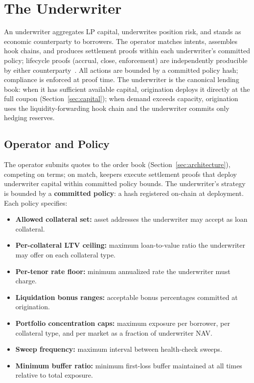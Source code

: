 \section{The Underwriter}
\label{sec:lp}

An underwriter aggregates LP capital, underwrites position risk, and stands as economic counterparty to borrowers. The operator matches intents, assembles hook chains, and produces settlement proofs within each underwriter's committed policy; lifecycle proofs (accrual, close, enforcement) are independently producible by either counterparty~\cite{daloc-decent2026}. All actions are bounded by a committed policy hash; compliance is enforced at proof time. The underwriter is the canonical lending book: when it has sufficient available capital, origination deploys it directly at the full coupon (Section~\ref{sec:capital}); when demand exceeds capacity, origination uses the liquidity-forwarding hook chain and the underwriter commits only hedging reserves.

\subsection{Operator and Policy}

The operator submits quotes to the order book (Section~\ref{sec:architecture}), competing on terms; on match, keepers execute settlement proofs that deploy underwriter capital within committed policy bounds. The underwriter's strategy is bounded by a \textbf{committed policy}: a hash registered on-chain at deployment. Each policy specifies:
\begin{itemize}
  \item \textbf{Allowed collateral set:} asset addresses the underwriter may accept as loan collateral.
  \item \textbf{Per-collateral LTV ceiling:} maximum loan-to-value ratio the underwriter may offer on each collateral type.
  \item \textbf{Per-tenor rate floor:} minimum annualized rate the underwriter must charge.
  \item \textbf{Liquidation bonus ranges:} acceptable bonus percentages committed at origination.
  \item \textbf{Portfolio concentration caps:} maximum exposure per borrower, per collateral type, and per market as a fraction of underwriter NAV.
  \item \textbf{Sweep frequency:} maximum interval between health-check sweeps.
  \item \textbf{Minimum buffer ratio:} minimum first-loss buffer maintained at all times relative to total exposure.
\end{itemize}


